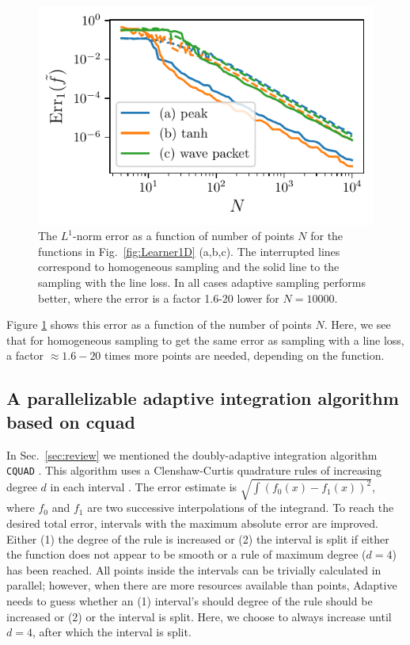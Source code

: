 \begin{figure}
\centering
\includegraphics{chapter_adaptive/figures/line_loss_error.pdf}
\caption{The $L^{1}$-norm error as a function of number of points $N$ for the functions in Fig.~\ref{fig:Learner1D} (a,b,c).
The interrupted lines correspond to homogeneous sampling and the solid line to the sampling with the line loss.
In all cases adaptive sampling performs better, where the error is a factor 1.6-20 lower for $N=10000$.\label{fig:line_loss_error}}
\end{figure}

Figure \ref{fig:line_loss_error} shows this error as a function of the number of points $N$.
Here, we see that for homogeneous sampling to get the same error as sampling with a line loss, a factor $\approx 1.6-20$ times more points are needed, depending on the function.

\subsection{A parallelizable adaptive integration algorithm based on cquad}


In Sec.~\ref{sec:review} we mentioned the doubly-adaptive integration algorithm \passthrough{\lstinline!CQUAD!} \cite{Gonnet2010}.
This algorithm uses a Clenshaw-Curtis quadrature rules of increasing degree $d$ in each interval \cite{Clenshaw1960}.
The error estimate is $\sqrt{\int{\left(f_0(x) - f_1(x)\right)^2}}$, where $f_0$ and $f_1$ are two successive interpolations of the integrand.
To reach the desired total error, intervals with the maximum absolute error are improved.
Either (1) the degree of the rule is increased or (2) the interval is split if either the function does not appear to be smooth or a rule of maximum degree ($d=4$) has been reached.
All points inside the intervals can be trivially calculated in parallel; however, when there are more resources available than points, Adaptive needs to guess whether an (1) interval's should degree of the rule should be increased or (2) or the interval is split.
Here, we choose to always increase until $d=4$, after which the interval is split.

